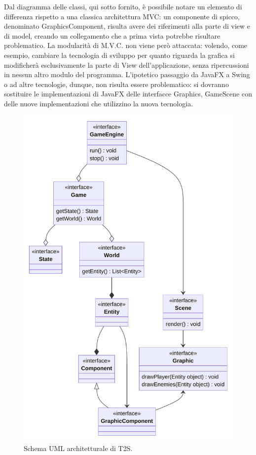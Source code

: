 \documentclass[a4paper,12pt]{report}
\begin{document}
Dal diagramma delle classi, qui sotto fornito, è possibile notare un elemento di differenza rispetto a una classica architettura MVC: un componente di spicco, denominato GraphicsComponent, risulta avere dei riferimenti alla parte di view e di model, creando un collegamento che a prima vista potrebbe risultare problematico.
La modularità di M.V.C. non viene però attaccata: volendo, come esempio, cambiare la tecnologia di sviluppo per quanto riguarda la grafica si modificherà esclusivamente la parte di View dell'applicazione, senza ripercussioni in nessun altro modulo del programma.
L’ipotetico passaggio da JavaFX a Swing o ad altre tecnologie, dunque, non risulta essere problematico: 
si dovranno sostituire le implementazioni di JavaFX delle interfacce Graphics, GameScene con delle nuove implementazioni che utilizzino la nuova tecnologia.
	
\begin{figure}[H]
\centering{}
\includegraphics[width=1\textwidth]{img/SoftwareArchitectureUML.pdf}
\caption{Schema UML architetturale di T2S.}
\label{img:analysis}
\end{figure}
\end{document}
